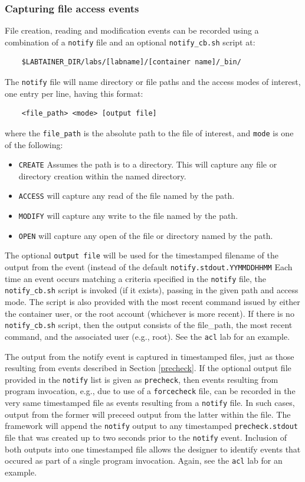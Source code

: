 \documentclass[12pt]{article}
\begin{document}
\subsubsection{Capturing file access events}
\label{notify}
File creation, reading and modification events can be recorded using a combination of
a {\tt notify} file and an optional {\tt notify\_cb.sh} script at:
\begin{verbatim}
    $LABTAINER_DIR/labs/[labname]/[container name]/_bin/
\end{verbatim}
\noindent The {\tt notify} file will name directory or file paths and the access modes of interest, one entry
per line, having this format:
\begin{verbatim}
    <file_path> <mode> [output file]
\end{verbatim}
\noindent
where the {\tt file\_path} is the absolute path to the file of interest, and {\tt mode} is 
one of the following:
\begin{itemize}
\item {\tt CREATE} Assumes the path is to a directory.  This will capture any file or directory
creation within the named directory.
\item {\tt ACCESS} will capture any read of the file named by the path.
\item {\tt MODIFY} will capture any write to the file named by the path.
\item {\tt OPEN} will capture any open of the file or directory named by the path.
\end{itemize}
\noindent The optional {\tt output file} will be used for the timestamped filename of the
output from the event (instead of the default {\tt notify.stdout.YYMMDDHHMM}
\noindent Each time an event occurs matching a criteria specified in the {\tt notify} file,
the {\tt notify\_cb.sh} script is invoked (if it exists), passing in the given path and access mode.  
The script is also provided with the most recent command issued by either the container user, or the
root account (whichever is more recent).
If there is no {\tt notify\_cb.sh} script, then the output consists of the file\_path, the most recent
command, and the associated user (e.g., root).
See the {\tt acl} lab for an example.

The output from the notify event is captured in timestamped files, just as
those resulting from events described in Section \ref{precheck}.  If the optional output file
provided in the {\tt notify} list is given as {\tt precheck}, then
events resulting from program invocation, e.g., due to use of
a {\tt forcecheck} file, can be recorded in the very same timestamped file as events resulting
from a {\tt notify} file.  In such cases, output from the former will preceed output from the latter
within the file.  The framework will append the {\tt notify} output to any timestamped {\tt precheck.stdout}
file that was created up to two seconds prior to the {\tt notify} event.  Inclusion of both outputs into
one timestamped file allows the designer to identify events that occured as part of a single program
invocation.  Again, see the {\tt acl} lab for an example.
\end{document}
